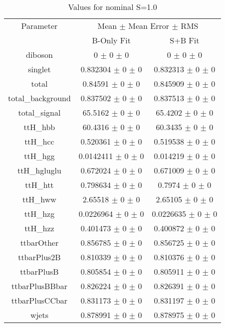 \begin{table}
\centering
\caption{Values for nominal S=1.0}
\begin{tabular}{ccc}
\toprule
Parameter 	& \multicolumn{2}{c}{Mean $\pm$ Mean Error $\pm$ RMS}\\
 	& B-Only Fit & S+B Fit\\
\midrule
diboson 	& \num{0} $\pm$ \num{0} $\pm$ \num{0} 	& \num{0} $\pm$ \num{0} $\pm$ \num{0}\\
singlet 	& \num{0.832304} $\pm$ \num{0} $\pm$ \num{0} 	& \num{0.832313} $\pm$ \num{0} $\pm$ \num{0}\\
total 	& \num{0.84591} $\pm$ \num{0} $\pm$ \num{0} 	& \num{0.845909} $\pm$ \num{0} $\pm$ \num{0}\\
total\_background 	& \num{0.837502} $\pm$ \num{0} $\pm$ \num{0} 	& \num{0.837513} $\pm$ \num{0} $\pm$ \num{0}\\
total\_signal 	& \num{65.5162} $\pm$ \num{0} $\pm$ \num{0} 	& \num{65.4202} $\pm$ \num{0} $\pm$ \num{0}\\
ttH\_hbb 	& \num{60.4316} $\pm$ \num{0} $\pm$ \num{0} 	& \num{60.3435} $\pm$ \num{0} $\pm$ \num{0}\\
ttH\_hcc 	& \num{0.520361} $\pm$ \num{0} $\pm$ \num{0} 	& \num{0.519538} $\pm$ \num{0} $\pm$ \num{0}\\
ttH\_hgg 	& \num{0.0142411} $\pm$ \num{0} $\pm$ \num{0} 	& \num{0.014219} $\pm$ \num{0} $\pm$ \num{0}\\
ttH\_hgluglu 	& \num{0.672024} $\pm$ \num{0} $\pm$ \num{0} 	& \num{0.671009} $\pm$ \num{0} $\pm$ \num{0}\\
ttH\_htt 	& \num{0.798634} $\pm$ \num{0} $\pm$ \num{0} 	& \num{0.7974} $\pm$ \num{0} $\pm$ \num{0}\\
ttH\_hww 	& \num{2.65518} $\pm$ \num{0} $\pm$ \num{0} 	& \num{2.65105} $\pm$ \num{0} $\pm$ \num{0}\\
ttH\_hzg 	& \num{0.0226964} $\pm$ \num{0} $\pm$ \num{0} 	& \num{0.0226635} $\pm$ \num{0} $\pm$ \num{0}\\
ttH\_hzz 	& \num{0.401473} $\pm$ \num{0} $\pm$ \num{0} 	& \num{0.400872} $\pm$ \num{0} $\pm$ \num{0}\\
ttbarOther 	& \num{0.856785} $\pm$ \num{0} $\pm$ \num{0} 	& \num{0.856725} $\pm$ \num{0} $\pm$ \num{0}\\
ttbarPlus2B 	& \num{0.810339} $\pm$ \num{0} $\pm$ \num{0} 	& \num{0.810376} $\pm$ \num{0} $\pm$ \num{0}\\
ttbarPlusB 	& \num{0.805854} $\pm$ \num{0} $\pm$ \num{0} 	& \num{0.805911} $\pm$ \num{0} $\pm$ \num{0}\\
ttbarPlusBBbar 	& \num{0.826224} $\pm$ \num{0} $\pm$ \num{0} 	& \num{0.826391} $\pm$ \num{0} $\pm$ \num{0}\\
ttbarPlusCCbar 	& \num{0.831173} $\pm$ \num{0} $\pm$ \num{0} 	& \num{0.831197} $\pm$ \num{0} $\pm$ \num{0}\\
wjets 	& \num{0.878991} $\pm$ \num{0} $\pm$ \num{0} 	& \num{0.878975} $\pm$ \num{0} $\pm$ \num{0}\\
\bottomrule
\end{tabular}
\end{table}